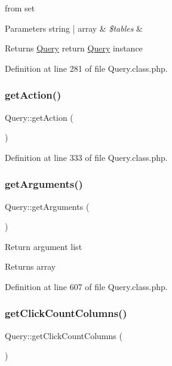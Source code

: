 from set 
\begin{DoxyParams}[1]{Parameters}
string | array & {\em \$tables} & \\
\hline
\end{DoxyParams}
\begin{DoxyReturn}{Returns}
\hyperlink{classQuery}{Query} return \hyperlink{classQuery}{Query} instance 
\end{DoxyReturn}


Definition at line 281 of file Query.\+class.\+php.

\hypertarget{classQuery_af51085dc05333d2a51cda11152c51b31}{}\label{classQuery_af51085dc05333d2a51cda11152c51b31} 
\subsubsection{\texorpdfstring{get\+Action()}{getAction()}}
{\footnotesize\ttfamily Query\+::get\+Action (\begin{DoxyParamCaption}{ }\end{DoxyParamCaption})}



Definition at line 333 of file Query.\+class.\+php.

\hypertarget{classQuery_af50db41315e7cd2b0c05040933905d11}{}\label{classQuery_af50db41315e7cd2b0c05040933905d11} 
\subsubsection{\texorpdfstring{get\+Arguments()}{getArguments()}}
{\footnotesize\ttfamily Query\+::get\+Arguments (\begin{DoxyParamCaption}{ }\end{DoxyParamCaption})}

Return argument list \begin{DoxyReturn}{Returns}
array 
\end{DoxyReturn}


Definition at line 607 of file Query.\+class.\+php.

\hypertarget{classQuery_ab762a676eb3b0a5f78b3bccd04af233f}{}\label{classQuery_ab762a676eb3b0a5f78b3bccd04af233f} 
\subsubsection{\texorpdfstring{get\+Click\+Count\+Columns()}{getClickCountColumns()}}
{\footnotesize\ttfamily Query\+::get\+Click\+Count\+Columns (\begin{DoxyParamCaption}{ }\end{DoxyParamCaption})}



